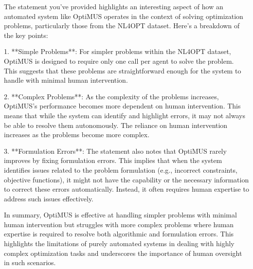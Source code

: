 The statement you've provided highlights an interesting aspect of how an automated system like OptiMUS operates in the context of solving optimization problems, particularly those from the NL4OPT dataset. Here's a breakdown of the key points:

1. **Simple Problems**: For simpler problems within the NL4OPT dataset, OptiMUS is designed to require only one call per agent to solve the problem. This suggests that these problems are straightforward enough for the system to handle with minimal human intervention.

2. **Complex Problems**: As the complexity of the problems increases, OptiMUS's performance becomes more dependent on human intervention. This means that while the system can identify and highlight errors, it may not always be able to resolve them autonomously. The reliance on human intervention increases as the problems become more complex.

3. **Formulation Errors**: The statement also notes that OptiMUS rarely improves by fixing formulation errors. This implies that when the system identifies issues related to the problem formulation (e.g., incorrect constraints, objective functions), it might not have the capability or the necessary information to correct these errors automatically. Instead, it often requires human expertise to address such issues effectively.

In summary, OptiMUS is effective at handling simpler problems with minimal human intervention but struggles with more complex problems where human expertise is required to resolve both algorithmic and formulation errors. This highlights the limitations of purely automated systems in dealing with highly complex optimization tasks and underscores the importance of human oversight in such scenarios.